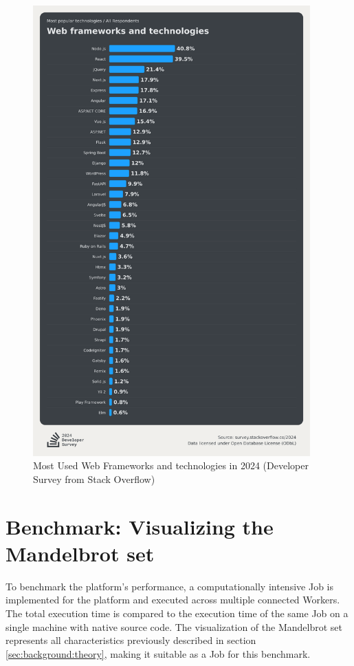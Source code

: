 \begin{figure}[htbp]
  \centering
  \includegraphics[width=0.95\textwidth]{gfx/figures/FrameworkSurvey2024.png}
  \caption{Most Used Web Frameworks and technologies in 2024 (Developer Survey from Stack Overflow) \cite{frontend:popularity}}
  \label{fig:methodology:popularFE}
\end{figure}

\section{Benchmark: Visualizing the Mandelbrot set}
\label{sec:methodology:benchmark}
To benchmark the platform's performance, a computationally intensive Job is implemented for the platform and executed across multiple connected Workers. The total execution time is compared to the execution time of the same Job on a single machine with native source code. The visualization of the Mandelbrot set represents all characteristics previously described in section \ref{sec:background:theory}, making it suitable as a Job for this benchmark.

